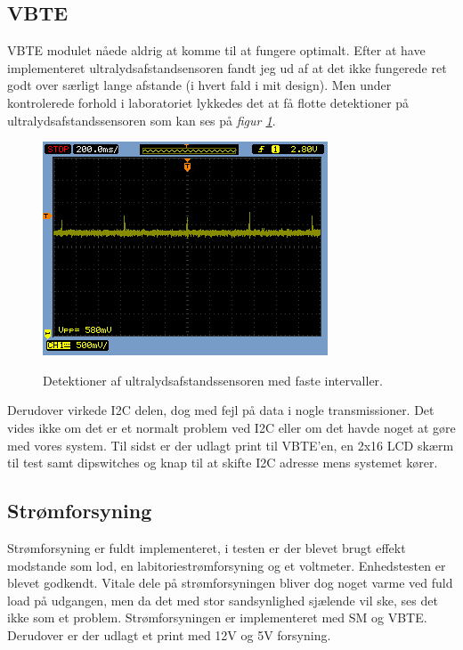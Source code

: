 \subsection{VBTE}
VBTE modulet nåede aldrig at komme til at fungere optimalt. Efter at have implementeret ultralydsafstandsensoren fandt jeg ud af at det ikke fungerede ret godt over særligt lange afstande (i hvert fald i mit design). Men under kontrolerede forhold i laboratoriet lykkedes det at få flotte detektioner på ultralydsafstandssensoren som kan ses på \textit{figur \ref{res:ultraresultater}}.
\begin{figure}[H]
\centering
\includegraphics[width = .5\textwidth]{billeder/mixer2}
\label{res:ultraresultater}
\caption{Detektioner af ultralydsafstandssensoren med faste intervaller.}
\end{figure}
Derudover virkede I2C delen, dog med fejl på data i nogle transmissioner. Det vides ikke om det er et normalt problem ved I2C eller om det havde noget at gøre med vores system. Til sidst er der udlagt print til VBTE'en, en 2x16 LCD skærm til test samt dipswitches og knap til at skifte I2C adresse mens systemet kører. 

\subsection{Strømforsyning}
Strømforsyning er fuldt implementeret, i testen er der blevet brugt effekt modstande som lod, en labitoriestrømforsyning og et voltmeter. Enhedstesten er blevet godkendt. Vitale dele på strømforsyningen bliver dog noget varme ved fuld load på udgangen, men da det med stor sandsynlighed sjælende vil ske, ses det ikke som et problem. Strømforsyningen er implementeret med SM og VBTE. Derudover er der udlagt et print med 12V og 5V forsyning.

